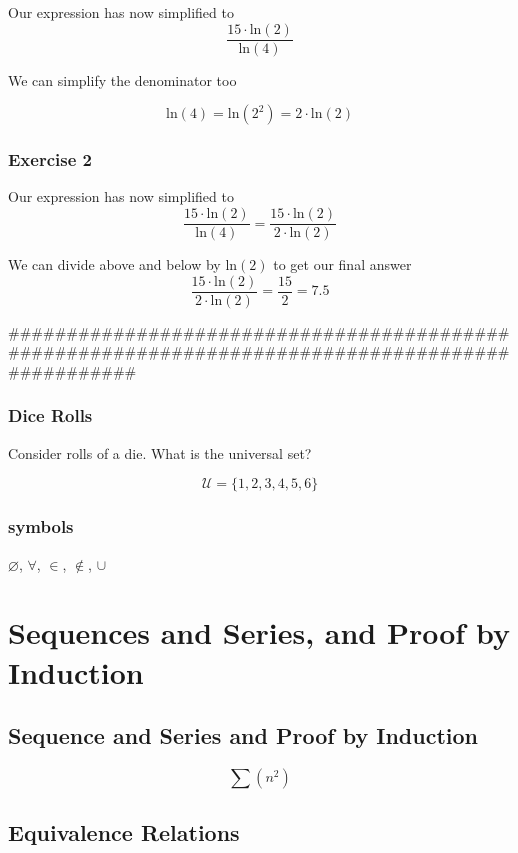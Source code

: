 Our expression has now simplified to 
\[\frac{15 \cdot \mbox{ln}(2) }{\mbox{ln}(4)} \]

We can simplify the denominator too

\[ \mbox{ln}(4) =  \mbox{ln}(2^2) = 2 \cdot \mbox{ln}(2) \]



\subsection{Exercise 2}

Our expression has now simplified to 
\[\frac{15 \cdot \mbox{ln}(2) }{\mbox{ln}(4)} = \frac{15 \cdot \mbox{ln}(2) }{2 \cdot \mbox{ln}(2)} \]

We can divide above and below by $\mbox{ln}(2)$ to get our final answer
\[ \frac{15 \cdot \mbox{ln}(2) }{2 \cdot \mbox{ln}(2)} = \frac{15}{2} = 7.5 \]

#################################################################################################



\subsection*{Dice Rolls}
Consider rolls of a die. What is the universal set?

\[ \mathcal{U} = \{1,2,3,4,5,6\} \]


\subsection*{symbols}
$\varnothing$,
$\forall$,
$\in$,
$\notin$,
$\cup$

\chapter{Sequences and Series, and Proof by Induction}
\section{Sequence and Series and Proof by Induction}


\[\sum (n^2) \]


\section*{Equivalence Relations}

